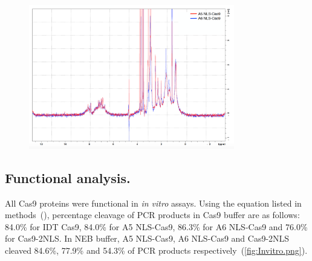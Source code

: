 \documentclass[11pt]{article}
\begin{document}
\begin{figure}[H]
  \centering
    \includegraphics[width=0.8\textwidth]{NMR.png}
    \label{fig:NMR.png}
\end{figure}

\subsection{Functional analysis.}

All Cas9 proteins were functional in \textit{in vitro} assays. Using the equation listed in methods~(), percentage cleavage of PCR products in Cas9 buffer are as follows: 84.0\% for IDT Cas9, 84.0\% for A5 NLS-Cas9, 86.3\% for A6 NLS-Cas9 and 76.0\% for Cas9-2NLS. In NEB buffer, A5 NLS-Cas9, A6 NLS-Cas9 and Cas9-2NLS cleaved 84.6\%, 77.9\% and 54.3\% of PCR products respectively~(\autoref{fig:Invitro.png}). 
\end{document}
